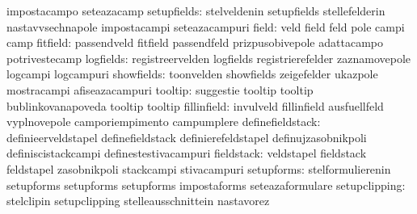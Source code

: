                                   impostacampo                     seteazacamp
                     setupfields: stelveldenin                     setupfields
                                  stellefelderin                   nastavvsechnapole
                                  impostacampi                     seteazacampuri
                           field: veld                             field
                                  feld                             pole
                                  campi                            camp
                        fitfield: passendveld                      fitfield
                                  passendfeld                      prizpusobivepole %
                                  adattacampo                      potrivestecamp
                       logfields: registreervelden                 logfields
                                  registrierefelder                zaznamovepole
                                  logcampi                         logcampuri %
                      showfields: toonvelden                       showfields
                                  zeigefelder                      ukazpole
                                  mostracampi                      afiseazacampuri
                         tooltip: suggestie                        tooltip
                                  tooltip                          bublinkovanapoveda
                                  tooltip                          tooltip %
                     fillinfield: invulveld                        fillinfield
                                  ausfuellfeld                     vyplnovepole
                                  camporiempimento                 campumplere
                definefieldstack: definieerveldstapel              definefieldstack
                                  definierefeldstapel              definujzasobnikpoli
                                  definiscistackcampi              definestestivacampuri %
                      fieldstack: veldstapel                       fieldstack
                                  feldstapel                       zasobnikpoli
                                  stackcampi                       stivacampuri
                      setupforms: stelformulierenin                setupforms
                                  setupforms                       setupforms
                                  impostaforms                     seteazaformulare %
                   setupclipping: stelclipin                       setupclipping
                                  stelleausschnittein              nastavorez
